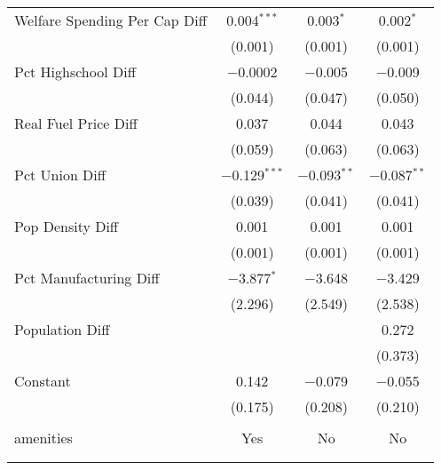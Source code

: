 \begin{table}[!htbp]
\begin{tabular}{@{\extracolsep{5pt}}lccc}
  Welfare Spending Per Cap Diff & 0.004$^{***}$ & 0.003$^{*}$ & 0.002$^{*}$ \\ 
  & (0.001) & (0.001) & (0.001) \\ 
  Pct Highschool Diff & $-$0.0002 & $-$0.005 & $-$0.009 \\ 
  & (0.044) & (0.047) & (0.050) \\ 
  Real Fuel Price Diff & 0.037 & 0.044 & 0.043 \\ 
  & (0.059) & (0.063) & (0.063) \\ 
  Pct Union Diff & $-$0.129$^{***}$ & $-$0.093$^{**}$ & $-$0.087$^{**}$ \\ 
  & (0.039) & (0.041) & (0.041) \\ 
  Pop Density Diff & 0.001 & 0.001 & 0.001 \\ 
  & (0.001) & (0.001) & (0.001) \\ 
  Pct Manufacturing Diff & $-$3.877$^{*}$ & $-$3.648 & $-$3.429 \\ 
  & (2.296) & (2.549) & (2.538) \\ 
  Population Diff &  &  & 0.272 \\ 
  &  &  & (0.373) \\ 
  Constant & 0.142 & $-$0.079 & $-$0.055 \\ 
  & (0.175) & (0.208) & (0.210) \\ 
 \hline \\[-1.8ex] 
amenities & Yes & No & No \\ 
\hline \\[-1.8ex] 
\hline 
\hline \\[-1.8ex] 
\end{tabular} 
\end{table} 
